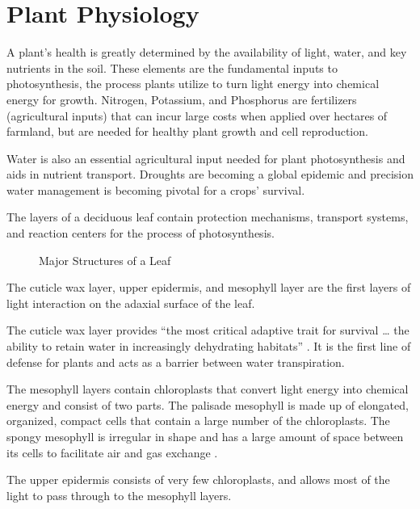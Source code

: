 \section{Plant Physiology}
A plant's health is greatly determined by the availability of light, water, and key nutrients in the soil.  These elements are the fundamental inputs to photosynthesis, the process plants utilize to turn light energy into chemical energy for growth.  Nitrogen, Potassium, and Phosphorus are fertilizers (agricultural inputs) that can incur large costs when applied over hectares of farmland, but are needed for healthy plant growth and cell reproduction.

Water is also an essential agricultural input needed for plant photosynthesis and aids in nutrient transport.  Droughts are becoming a global epidemic and precision water management is becoming pivotal for a crops' survival.

The layers of a deciduous leaf contain protection mechanisms, transport systems, and reaction centers for the process of photosynthesis.
%
\begin{figure}[!htb]
    \begin{center}
    \end{center}
    \caption{Major Structures of a Leaf}
    \label{fig:polarization}
\end{figure}
%
The cuticle wax layer, upper epidermis, and mesophyll layer are the first layers of light interaction on the adaxial surface of the leaf.

The cuticle wax layer provides “the most critical adaptive trait for survival … the ability to retain water in increasingly dehydrating habitats” \cite{cuticle}.  It is the first line of defense for plants and acts as a barrier between water transpiration.

The mesophyll layers contain chloroplasts that convert light energy into chemical energy and consist of two parts. The palisade mesophyll is made up of elongated, organized, compact cells that contain a large number of the chloroplasts.  The spongy mesophyll is irregular in shape and has a large amount of space between its cells to facilitate air and gas exchange \cite{plantexchange}.

The upper epidermis consists of very few chloroplasts, and allows most of the light to pass through to the mesophyll layers.




